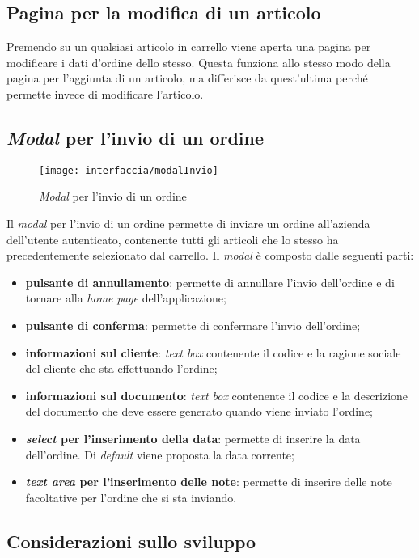 \subsection{Pagina per la modifica di un articolo}

Premendo su un qualsiasi articolo in carrello viene aperta una pagina per modificare i dati d'ordine dello stesso. Questa funziona allo stesso modo della pagina per l'aggiunta di un articolo, ma differisce da quest'ultima perché permette invece di modificare l'articolo.

\subsection{\textit{Modal} per l'invio di un ordine}

\begin{figure}[!h] 
    \centering 
    \texttt{[image: interfaccia/modalInvio]} 
    \caption{\textit{Modal} per l'invio di un ordine}
\end{figure}

Il \textit{modal} per l'invio di un ordine permette di inviare un ordine all'azienda dell'utente autenticato, contenente tutti gli articoli che lo stesso ha precedentemente selezionato dal carrello. Il \textit{modal} è composto dalle seguenti parti:
\begin{itemize}
	\item \textbf{pulsante di annullamento}: permette di annullare l'invio dell'ordine e di tornare alla \textit{home page} dell'applicazione;
	\item \textbf{pulsante di conferma}: permette di confermare l'invio dell'ordine;
	\item \textbf{informazioni sul cliente}: \textit{text box} contenente il codice e la ragione sociale del cliente che sta effettuando l'ordine;
	\item \textbf{informazioni sul documento}: \textit{text box} contenente il codice e la descrizione del documento che deve essere generato quando viene inviato l'ordine;
	\item \textbf{\textit{select} per l'inserimento della data}: permette di inserire la data dell'ordine. Di \textit{default} viene proposta la data corrente;
	\item \textbf{\textit{text area} per l'inserimento delle note}: permette di inserire delle note facoltative per l'ordine che si sta inviando.
\end{itemize}

\subsection{Considerazioni sullo sviluppo}

